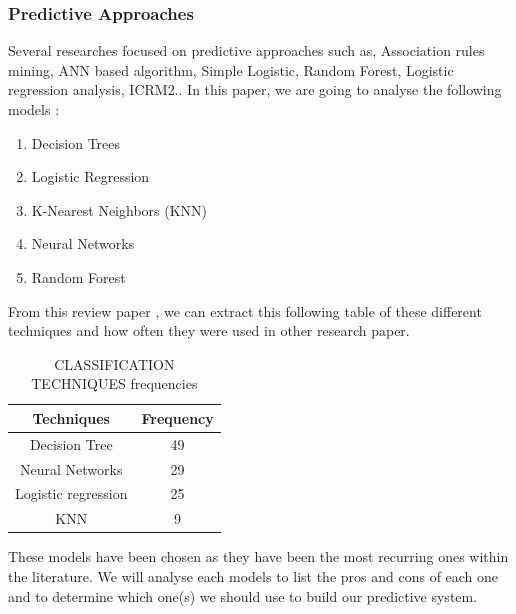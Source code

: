 \documentclass[conference]{IEEEtran}
\begin{document}
\subsubsection{Predictive Approaches}
\label{subsec:soa_predictiveapproach}
Several researches focused on predictive approaches such as, Association rules mining, ANN based algorithm, Simple Logistic, 
 Random Forest, Logistic regression analysis, ICRM2.\cite{mduma_survey_2019}. 
In this paper, we are going to analyse the following models \cite{mduma_survey_2019}\cite{quinlan_induction_1986,yadav_mining_2012,heredia_student_2015,ramirez_prediction_2018,cox_regression_1958,perez_modelo_2018,pandey_data_2011,cover_nearest_1967,mardolkar_forecasting_2020,zhang_neural_2000,rudin_stop_2019,siri_predicting_2015,m_alban_she_is_with_the_faculty_of_engineering_and_applied_sciences_of_the_technical_university_cotopaxi_neural_2019,boser_training_1992,lee_machine_2019,behr_early_2020,friedman_stochastic_2002,eckert_analysis_2015,tenpipat_student_2020,liang_machine_2016,liang_big_2016,fischer_angulo_modelo_2012,miranda_analysis_2017,viloria_integration_2019,kemper_predicting_2020,agrusti_university_2019}:
\begin{enumerate}
\item Decision Trees
\item Logistic Regression
\item K-Nearest Neighbors (KNN)
\item Neural Networks
\item Random Forest
\end{enumerate}
From this review paper \cite{agrusti_university_2019}, we can extract this following table of these different techniques and how often they were used in other research paper.
\begin{table}[H]
    \centering
    \caption{CLASSIFICATION TECHNIQUES frequencies\cite{agrusti_university_2019}}
    \begin{tabular}{|c|c|}
        \hline
        \textbf{Techniques} & \textbf{Frequency}\\
        \hline
        Decision Tree & 49\\
        \hline
        Neural Networks & 29\\
        \hline
        Logistic regression & 25\\
        \hline
        KNN & 9\\
        \hline
    \end{tabular}
    \label{tab:class_tech_freq_agrusti}
\end{table}
These models have been chosen as they have been the most recurring ones within the literature. We will analyse each models to list the pros and cons of each one and to determine which one(s) we should use to build our predictive system.
\end{document}
